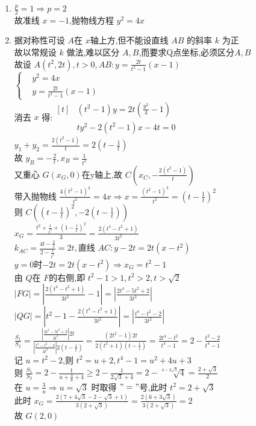 \documentclass[class=ctexart,crop=false]{standalone}
\begin{document}
\begin{enumerate}[label=(\Roman*)]
    \item 
        $\frac{p}{2}=1 \Rightarrow p=2$\\
        故准线 $x=-1$,抛物线方程 $y^2=4x$
    \item  
        据对称性可设 $A$在 $x$轴上方,但不能设直线 $AB$ 的斜率 $k$ 为正\\
        故以常规设 $k$ 做法,难以区分 $A,B$,而要求Q点坐标,必须区分$A,B$\\
        故设 $A(t^2,2t),t>0, AB:y=\frac{2t}{t^2-1}(x-1)$\\
        $\left\{\begin{aligned}
        &y^2=4x   \\ 
        &y=\frac{2t}{t^2-1}(x-1)
        \end{aligned}\right.$\\
        消去 $x$ 得:$\begin{aligned}[t]
            &(t^2-1)y=2t(\frac{y^2}{4}-1)\\
            &ty^2-2(t^2-1)x-4t=0
        \end{aligned}$\\
        $y_1+y_2=\frac{2(t^2-1)}{t}=2(t-\frac{1}{t})$\\
        故 $y_B=-\frac{2}{t},x_B=\frac{1}{t^2}$\\
        又重心 $G(x_G,0)$在y轴上,故 $C(x_C,-\frac{2(t^2-1)}{t})$\\
        带入抛物线 $\frac{4(t^2-1)^2}{t^2}=4x\Rightarrow x=\frac{(t^2-1)^2}{t^2}=(t-\frac{1}{t})^2$\\
        则 $C((t-\frac{1}{t})^2,-2(t-\frac{1}{t}))$\\
        $x_G=\frac{t^2+\frac{1}{t^2}+(1-\frac{1}{t})^2}{3}=\frac{2(t^4-t^2+1)}{3t^2}$\\
        $k_{AC}=\frac{4t-\frac{2}{t}}{2-\frac{1}{t^2}}=2t,$直线 $AC:y-2t=2t(x-t^2)$\\
        $y=0$时$-2t=2t(x-t^2)\Rightarrow x_G=t^2-1$\\
        由 $Q$在 $F$的右侧,即 $t^2-1>1,t^2>2,t>\sqrt{2}$\\
        $|FG|=|\frac{2(t^4-t^2+1)}{3t^2}-1|=|\frac{2t^4-5t^2+2}{3t^2}|$\\
        $|QG|=|t^2-1-\frac{2(t^4-t^2+1)}{3t^2}|=|\frac{t^4-t^2-2}{3t^2}|$\\
        $\frac{S_1}{S_2}=\frac{|\frac{2t^4-5t^2+2}{3t^2}|2t}{|\frac{t^4-t^2-2}{3t^2}|2(t-\frac{1}{t})}
        =\frac{(2t^2-1)2t}{2(t^2+1)(t-\frac{1}{t})}=\frac{2t^4-t^2}{t^4-1}=2-\frac{t^2-2}{t^4-1}$\\
        记 $u=t^2-2$,则 $t^2=u+2,t^4-1=u^2+4u+3$\\
        则 $\frac{S_1}{S_2}=2-\frac{1}{u+\frac{3}{u}+4}\geqslant 2-\frac{1}{2\sqrt{3}+4}
        =2-\sqrt[4-2\sqrt{3}]{4}=\frac{2+\sqrt{3}}{2}$\\
        在 $u=\frac{3}{u}\Rightarrow u=\sqrt{3}$ 时取得 $"="$号,此时 $t^2=2+\sqrt{3}$\\
        此时 $x_G=\frac{2(7+4\sqrt{3}-2-\sqrt{3}+1)}{3(2+\sqrt{3})}=\frac{2(6+3\sqrt{3})}{3(2+\sqrt{3})}=2$\\
        故 $G(2,0)$
\end{enumerate}
\end{document}
